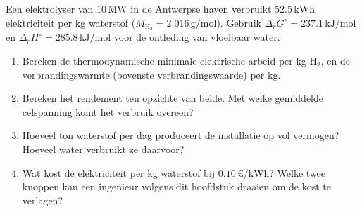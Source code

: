 \begin{oefening}
Een elektrolyser van \(10\,\mathrm{MW}\) in de Antwerpse haven verbruikt \(52.5\,\mathrm{kWh}\) elektriciteit per kg waterstof (\(M_{\mathrm{H_2}} = 2.016\,\mathrm{g/mol}\)). Gebruik \(\Delta_r G^\circ = 237.1\,\mathrm{kJ/mol}\) en \(\Delta_r H^\circ = 285.8\,\mathrm{kJ/mol}\) voor de ontleding van vloeibaar water.

\begin{enumerate}
\item[(a)]
  Bereken de thermodynamische minimale elektrische arbeid per kg \(\mathrm{H_2}\), en de verbrandingswarmte (bovenste verbrandingswaarde) per kg.
\item[(b)]
  Bereken het rendement ten opzichte van beide. Met welke gemiddelde celspanning komt het verbruik overeen?
\item[(c)]
  Hoeveel ton waterstof per dag produceert de installatie op vol vermogen? Hoeveel water verbruikt ze daarvoor?
\item[(d)]
  Wat kost de elektriciteit per kg waterstof bij \(0.10\,\text{€/kWh}\)? Welke twee knoppen kan een ingenieur volgens dit hoofdstuk draaien om de kost te verlagen?
\end{enumerate}
\end{oefening}
